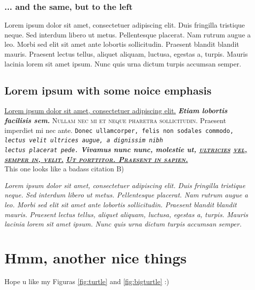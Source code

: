\documentclass[a4paper,12pt]{article}
\begin{document}
\subsubsection{... and the same, but to the left}
\begin{flushleft}
Lorem ipsum dolor sit amet, consectetuer adipiscing elit. Duis fringilla tristique neque. Sed interdum libero ut metus. Pellentesque placerat. Nam rutrum augue a leo. Morbi sed elit sit amet ante lobortis sollicitudin. Praesent blandit blandit mauris. Praesent lectus tellus, aliquet aliquam, luctusa, egestas a, turpis. Mauris lacinia lorem sit amet ipsum. Nunc quis urna dictum turpis accumsan semper.
\end{flushleft}

\subsection{Lorem ipsum with some noice emphasis}
\underline{Lorem ipsum dolor sit amet, consectetuer adipiscing elit.} \textbf{\textit{Etiam lobortis facilisis sem.}} \textsc{Nullam nec mi et neque pharetra sollicitudin.} \textsf{Praesent imperdiet mi nec ante.} \texttt{Donec ullamcorper, felis non sodales commodo,} \textit{\texttt{lectus velit ultrices augue, a dignissim nibh} \\ \texttt{lectus placerat pede.}} \textbf{\textit{Vivamus nunc nunc, molestie ut, \textsc{\underline{ultricies} \underline{vel, semper in, velit.}}}} \textbf{\textit{\textsf{\textsc{\underline{Ut porttitor. }\underline{Praesent in sapien.}}}}} \\

This one looks like a badass citation B)

\begin{flushright}
\textit{Lorem ipsum dolor sit amet, consectetuer adipiscing elit. Duis fringilla tristique neque. Sed interdum libero ut metus. Pellentesque placerat. Nam rutrum augue a leo. Morbi sed elit sit amet ante lobortis sollicitudin. Praesent blandit blandit mauris. Praesent lectus tellus, aliquet aliquam, luctusa, egestas a, turpis. Mauris lacinia lorem sit amet ipsum. Nunc quis urna dictum turpis accumsan semper.}
\end{flushright}

\section{Hmm, another nice things}
Hope u like my Figuras \ref{fig:turtle} and \ref{fig:bigturtle} :)
\end{document}
